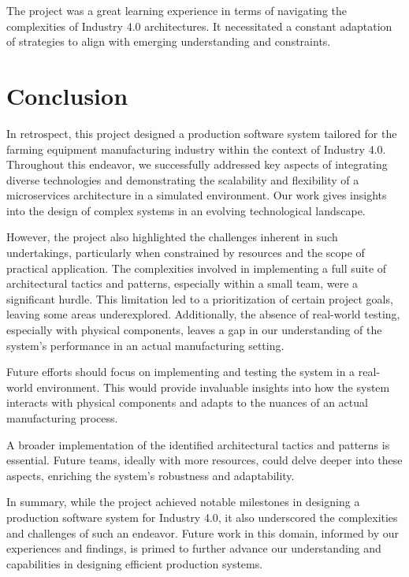 \documentclass[conference]{IEEEtran}
\begin{document}
The project was a great learning experience in terms of navigating the complexities of Industry 4.0 architectures. It necessitated a constant adaptation of strategies to align with emerging understanding and constraints.

\section{Conclusion}

In retrospect, this project designed a production software system tailored for the farming equipment manufacturing industry within the context of Industry 4.0. Throughout this endeavor, we successfully addressed key aspects of integrating diverse technologies and demonstrating the scalability and flexibility of a microservices architecture in a simulated environment. Our work gives insights into the design of complex systems in an evolving technological landscape.

However, the project also highlighted the challenges inherent in such undertakings, particularly when constrained by resources and the scope of practical application. The complexities involved in implementing a full suite of architectural tactics and patterns, especially within a small team, were a significant hurdle. This limitation led to a prioritization of certain project goals, leaving some areas underexplored. Additionally, the absence of real-world testing, especially with physical components, leaves a gap in our understanding of the system's performance in an actual manufacturing setting.

Future efforts should focus on implementing and testing the system in a real-world environment. This would provide invaluable insights into how the system interacts with physical components and adapts to the nuances of an actual manufacturing process.

A broader implementation of the identified architectural tactics and patterns is essential. Future teams, ideally with more resources, could delve deeper into these aspects, enriching the system's robustness and adaptability.

In summary, while the project achieved notable milestones in designing a production software system for Industry 4.0, it also underscored the complexities and challenges of such an endeavor. Future work in this domain, informed by our experiences and findings, is primed to further advance our understanding and capabilities in designing efficient production systems.



\vspace{12pt}
\end{document}
